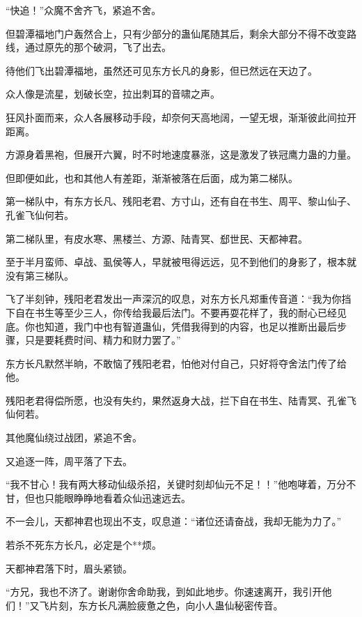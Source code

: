 
\begin{this_body}

“快追！”众魔不舍齐飞，紧追不舍。

但碧潭福地门户轰然合上，只有少部分的蛊仙尾随其后，剩余大部分不得不改变路线，通过原先的那个破洞，飞了出去。

待他们飞出碧潭福地，虽然还可见东方长凡的身影，但已然远在天边了。

众人像是流星，划破长空，拉出刺耳的音啸之声。

狂风扑面而来，众人各展移动手段，却奈何天高地阔，一望无垠，渐渐彼此间拉开距离。

方源身着黑袍，但展开六翼，时不时地速度暴涨，这是激发了铁冠鹰力蛊的力量。

但即便如此，也和其他人有差距，渐渐被落在后面，成为第二梯队。

第一梯队中，有东方长凡、残阳老君、方寸山，还有自在书生、周平、黎山仙子、孔雀飞仙何若。

第二梯队里，有皮水寒、黑楼兰、方源、陆青冥、郄世民、天都神君。

至于半月蛮师、卓战、虱侯等人，早就被甩得远远，见不到他们的身影了，根本就没有第三梯队。

飞了半刻钟，残阳老君发出一声深沉的叹息，对东方长凡郑重传音道：“我为你挡下自在书生等至少三人，你传给我最后法门。不要再耍花样了，我的耐心已经见底。你也知道，我门中也有智道蛊仙，凭借我得到的内容，也足以推断出最后步骤，只是要耗费时间、精力和财力罢了。”

东方长凡默然半晌，不敢恼了残阳老君，怕他对付自己，只好将夺舍法门传了给他。

残阳老君得偿所愿，也没有失约，果然返身大战，拦下自在书生、陆青冥、孔雀飞仙何若。

其他魔仙绕过战团，紧追不舍。

又追逐一阵，周平落了下去。

“我不甘心！我有两大移动仙级杀招，关键时刻却仙元不足！！”他咆哮着，万分不甘，但也只能眼睁睁地看着众仙迅速远去。

不一会儿，天都神君也现出不支，叹息道：“诸位还请奋战，我却无能为力了。”

若杀不死东方长凡，必定是个**烦。

天都神君落下时，眉头紧锁。

“方兄，我也不济了。谢谢你舍命助我，到如此地步。你速速离开，我引开他们！”又飞片刻，东方长凡满脸疲惫之色，向小人蛊仙秘密传音。


\end{this_body}
